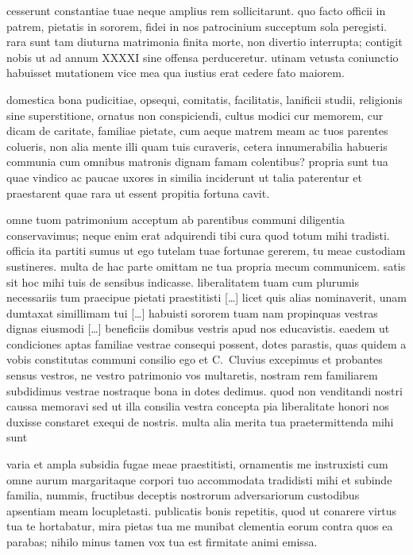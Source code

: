 cesserunt constantiae tuae neque amplius rem sollicitarunt. quo facto officii in patrem, pietatis in sororem, fidei in nos patrocinium succeptum sola peregisti. rara sunt tam diuturna matrimonia finita morte, non divertio interrupta; contigit nobis ut ad annum XXXXI sine offensa perduceretur. utinam vetusta coniunctio habuisset mutationem vice mea qua iustius erat cedere fato maiorem.

domestica bona pudicitiae, opsequi, comitatis, facilitatis, lanificii studii, religionis sine superstitione, ornatus non conspiciendi, cultus modici cur memorem, cur dicam de caritate, familiae pietate, cum aeque matrem meam ac tuos parentes colueris, non alia mente illi quam tuis curaveris, cetera innumerabilia habueris communia cum omnibus matronis dignam famam colentibus? propria sunt tua quae vindico ac paucae uxores in similia inciderunt ut talia paterentur et praestarent quae rara ut essent propitia fortuna cavit.

omne tuom patrimonium acceptum ab parentibus communi diligentia conservavimus; neque enim erat adquirendi tibi cura quod totum mihi tradisti. officia ita partiti sumus ut ego tutelam tuae fortunae gererem, tu meae custodiam sustineres. multa de hac parte omittam ne tua propria mecum communicem. satis sit hoc mihi tuis de sensibus indicasse. liberalitatem tuam cum plurumis necessariis tum praecipue pietati praestitisti [\dots] licet quis alias nominaverit, unam dumtaxat simillimam tui [\dots] habuisti sororem tuam nam propinquas vestras dignas eiusmodi [\dots] beneficiis domibus vestris apud nos educavistis. eaedem ut condiciones aptas familiae vestrae consequi possent, dotes parastis, quas quidem a vobis constitutas communi consilio ego et C.~Cluvius excepimus et probantes sensus vestros, ne vestro patrimonio vos multaretis, nostram rem familiarem subdidimus vestrae nostraque bona in dotes dedimus. quod non venditandi nostri caussa memoravi sed ut illa consilia vestra concepta pia liberalitate honori nos duxisse constaret exequi de nostris. multa alia merita tua praetermittenda mihi sunt 

varia et ampla subsidia fugae meae praestitisti, ornamentis me instruxisti cum omne aurum margaritaque corpori tuo accommodata tradidisti mihi et subinde familia, nummis, fructibus deceptis nostrorum adversariorum custodibus apsentiam meam locupletasti. publicatis bonis repetitis, quod ut conarere virtus tua te hortabatur, mira pietas tua me munibat clementia eorum contra quos ea parabas; nihilo minus tamen vox tua est firmitate animi emissa.

